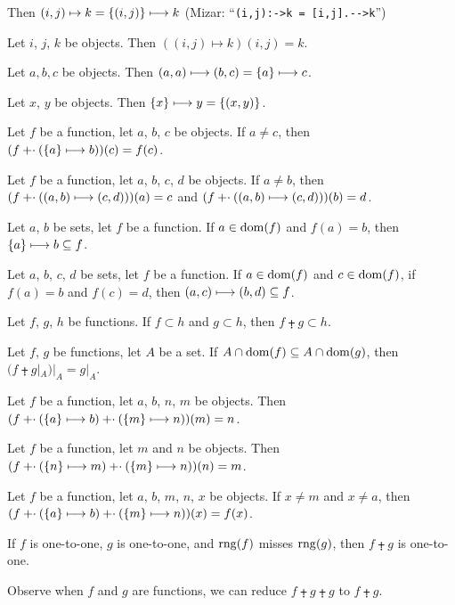 \documentclass{article}
\begin{document}
\begin{thm}
  Then $(i,j)\mapsto k = \{(i,j)\}\longmapsto k$ (Mizar: ``\verb#(i,j):->k = [i,j].-->k#'')
\item\label{funct4:80} Let $i$, $j$, $k$ be objects.
  Then $((i,j)\mapsto k)(i,j)=k$.
\item\label{funct4:81} Let $a,b,c$ be objects.
  Then $(a,a)\longmapsto(b,c)=\{a\}\longmapsto c$.
\item\label{funct4:82} Let $x$, $y$ be objects. Then $\{x\}\longmapsto y=\{(x,y)\}$.
\item\label{funct4:83} Let $f$ be a function, let $a$, $b$, $c$ be objects.
  If $a\neq c$, then $(f\mathbin{\mathord{+}\cdot}(\{a\}\longmapsto b))(c)=f(c)$.
\item\label{funct4:84} Let $f$ be a function, let $a$, $b$, $c$, $d$ be objects.
  If $a\neq b$, then $(f\mathbin{\mathord{+}\cdot}((a,b)\longmapsto(c,d)))(a)=c$
  and $(f\mathbin{\mathord{+}\cdot}((a,b)\longmapsto(c,d)))(b)=d$.
\item\label{funct4:85} Let $a$, $b$ be sets, let $f$ be a function.
  If $a\in\operatorname{dom}(f)$ and $f(a)=b$, then $\{a\}\longmapsto b\subseteq f$.
\item\label{funct4:86} Let $a$, $b$, $c$, $d$ be sets, let $f$ be a function.
  If $a\in\operatorname{dom}(f)$ and $c\in\operatorname{dom}(f)$, if $f(a)=b$ and $f(c)=d$,
  then $(a,c)\longmapsto(b,d)\subseteq f$.
\item\label{funct4:87} Let $f$, $g$, $h$ be functions.
  If $f\subset h$ and $g\subset h$, then $f\plusdot g\subset h$.
\item\label{funct4:88} Let $f$, $g$ be functions, let $A$ be a set.
  If $A\cap\operatorname{dom}(f)\subseteq A\cap\operatorname{dom}(g)$, then $(f\plusdot g|_{A})|_{A}=g|_{A}$.
\item\label{funct4:89} Let $f$ be a function, let $a$, $b$, $n$, $m$ be objects.
  Then $(f\mathbin{\mathord{+}\cdot}(\{a\}\longmapsto b)\mathbin{\mathord{+}\cdot}(\{m\}\longmapsto n))(m)=n$.
\item\label{funct4:90} Let $f$ be a function, let $m$ and $n$ be objects.
  Then $(f\mathbin{\mathord{+}\cdot} (\{n\}\longmapsto m)\mathbin{\mathord{+}\cdot}(\{m\}\longmapsto n))(n)=m$.
\item\label{funct4:91} Let $f$ be a function, let $a$, $b$, $m$, $n$,
  $x$ be objects. If $x\neq m$ and $x\neq a$,
  then $(f\mathbin{\mathord{+}\cdot}(\{a\}\longmapsto b)\mathbin{\mathord{+}\cdot}(\{m\}\longmapsto n))(x)=f(x)$.
\item\label{funct4:92} If $f$ is one-to-one, $g$ is one-to-one, and
  $\operatorname{rng}(f)$ misses $\operatorname{rng}(g)$, then $f\plusdot g$ is one-to-one.
\end{thm}

Observe when $f$ and $g$ are functions, we can reduce $f\plusdot g\plusdot g$
to $f\plusdot g$.
\end{document}
